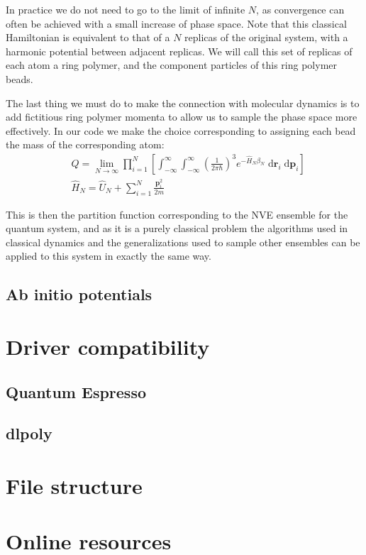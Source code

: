 \documentclass[12pt,fleqn]{report}
\newcommand{\dd}{\; \mathrm{d}}
\newcommand{\betan}{\beta_N}
\begin{document}
In practice we do not need to go to the limit of infinite \(N\), as convergence can often be achieved with a small increase of phase space. Note that this classical Hamiltonian is equivalent to that of a \(N\) replicas of the original system, with a harmonic potential between adjacent replicas. We will call this set of replicas of each atom a ring polymer, and the component particles of this ring polymer beads.

The last thing we must do to make the connection with molecular dynamics is to add fictitious ring polymer momenta to allow us to sample the phase space more effectively. In our code we make the choice corresponding to assigning each bead the mass of the corresponding atom:
\begin{align}
&Q = \lim_{N\to \infty} \prod_{i=1}^N \left[ \int_{-\infty}^\infty  
\int_{-\infty}^\infty \left( \frac{ 1 }{2 \pi \hbar} \right) ^3 
e^{-\hat{H}_N \betan} \dd \textbf{r}_i \dd \textbf{p}_i \right] \\
&\hat{H}_N = \hat{U}_N + \sum_{i=1}^N \frac{\textbf{p}_i^2}{2 m}
\end{align}

This is then the partition function corresponding to the NVE ensemble for the quantum system, and as it is a purely classical problem the algorithms used in classical dynamics and the generalizations used to sample other ensembles can be applied to this system in exactly the same way.
\subsection{Ab initio potentials}

\section{Driver compatibility}
\subsection{Quantum Espresso}
\subsection{dlpoly}
\section{File structure}
\section{Online resources}
\end{document}
